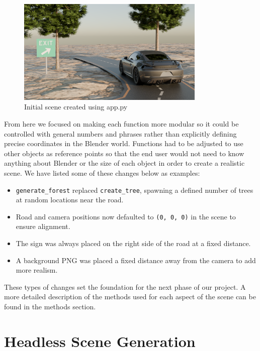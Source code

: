 \documentclass[journal]{IEEEtran}
\begin{document}
 \begin{figure}[H]
     \centering
     \includegraphics[width=0.8\textwidth]{images/initial_scene.png} %
     \caption{Initial scene created using app.py}
     \label{fig:initial_scene}
 \end{figure}
 
 From here we focused on making each function more modular so it could be controlled with general numbers and phrases rather than explicitly defining precise coordinates in the Blender world. Functions had to be adjusted to use other objects as reference points so that the end user would not need to know anything about Blender or the size of each object in order to create a realistic scene. We have listed some of these changes below as examples:
 
 \begin{itemize}
     \item \texttt{generate\_forest} replaced \texttt{create\_tree}, spawning a defined number of trees at random locations near the road.
     \item Road and camera positions now defaulted to \texttt{(0, 0, 0)} in the scene to ensure alignment.
     \item The sign was always placed on the right side of the road at a fixed distance.
     \item A background PNG was placed a fixed distance away from the camera to add more realism.
 \end{itemize}
 
 These types of changes set the foundation for the next phase of our project. A more detailed description of the methods used for each aspect of the scene can be found in the methods section. 
 
 
 \section{Headless Scene Generation}
 
\end{document}
